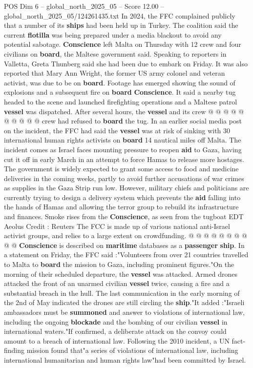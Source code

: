 \begin{textsample}{POS Dim 6 – global\_north\_2025\_05 – Score 12.00 – global\_north\_2025\_05/124261435.txt}
In 2024, the FFC complained publicly that a number of its \textbf{ships} had been held up in Turkey.
The coalition said the current \textbf{flotilla} was being prepared under a media blackout to avoid any potential sabotage. \textbf{Conscience} left Malta on Thursday with 12 crew and four civilians on \textbf{board}, the Maltese government said.
Speaking to reporters in Valletta, Greta Thunberg said she had been due to embark on Friday.
It was also reported that Mary Ann Wright, the former US army colonel and veteran activist, was due to be on \textbf{board}.
Footage has emerged showing the sound of explosions and a subsequent fire on \textbf{board} \textbf{Conscience}.
It said a nearby tug headed to the scene and launched firefighting operations and a Maltese patrol \textbf{vessel} was dispatched.
After several hours, the \textbf{vessel} and its crew @ @ @ @ @ @ @ @ @ @ crew had refused to \textbf{board} the tug.
In an earlier social media post on the incident, the FFC had said the \textbf{vessel} was at risk of sinking with 30 international human rights activists on \textbf{board} 14 nautical miles off Malta.
The incident comes as Israel faces mounting pressure to reopen \textbf{aid} to Gaza, having cut it off in early March in an attempt to force Hamas to release more hostages.
The government is widely expected to grant some access to food and medicine deliveries in the coming weeks, partly to avoid further accusations of war crimes as supplies in the Gaza Strip run low.
However, military chiefs and politicians are currently trying to design a delivery system which prevents the \textbf{aid} falling into the hands of Hamas and allowing the terror group to rebuild its infrastructure and finances.
Smoke rises from the \textbf{Conscience}, as seen from the tugboat EDT Aeolus Credit : Reuters The FCC is made up of various national anti-Israel activist groups, and relies to a large extent on crowdfunding. @ @ @ @ @ @ @ @ @ @ \textbf{Conscience} is described on \textbf{maritime} databases as a \textbf{passenger} \textbf{ship}.
In a statement on Friday, the FFC said :"Volunteers from over 21 countries travelled to Malta to \textbf{board} the mission to Gaza, including prominent figures."On the morning of their scheduled departure, the \textbf{vessel} was attacked.
Armed drones attacked the front of an unarmed civilian \textbf{vessel} twice, causing a fire and a substantial breach in the hull.
The last communication in the early morning of the 2nd of May indicated the drones are still circling the \textbf{ship}."It added :"Israeli ambassadors must be \textbf{summoned} and answer to violations of international law, including the ongoing \textbf{blockade} and the bombing of our civilian \textbf{vessel} in international waters."If confirmed, a deliberate attack on the convoy could amount to a breach of international law.
Following the 2010 incident, a UN fact-finding mission found that"a series of violations of international law, including international humanitarian and human rights law"had been committed by Israel.

\end{textsample}
